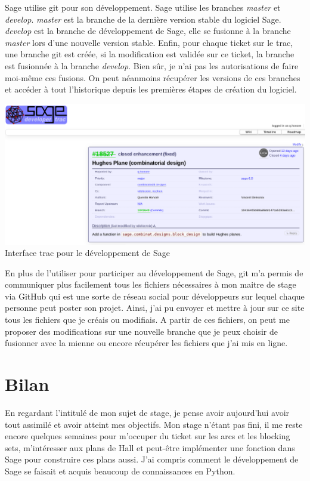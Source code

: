 \documentclass[a4paper]{article}
\begin{document}
Sage utilise git pour son développement. Sage utilise les branches \textit{master} et \textit{develop}. \textit{master} est la branche de la dernière version stable du logiciel Sage. \textit{develop} est la branche de développement de Sage, elle se fusionne à la branche \textit{master} lors d'une nouvelle version stable. Enfin, pour chaque ticket sur le trac, une branche git est créée, si la modification est validée sur ce ticket, la branche est fusionnée à la branche \textit{develop}. Bien sûr, je n'ai pas les autorisations de faire moi-même ces fusions. On peut néanmoins récupérer les versions de ces branches et accéder à tout l'historique depuis les premières étapes de création du logiciel. \vspace{2\baselineskip}\\
\begin{center}
  \includegraphics[scale=0.5]{trac.png}\\
  Interface trac pour le développement de Sage
\end{center}
\vspace{1\baselineskip}
En plus de l'utiliser pour participer au développement de Sage, git m'a permis de communiquer plus facilement tous les fichiers nécessaires à mon maitre de stage via GitHub qui est une sorte de réseau social pour développeurs sur lequel chaque personne peut poster son projet. Ainsi, j'ai pu envoyer et mettre à jour sur ce site tous les fichiers que je créais ou modifiais. A partir de ces fichiers, on peut me proposer des modifications sur une nouvelle branche que je peux choisir de fusionner avec la mienne ou encore récupérer les fichiers que j'ai mis en ligne.


\newpage
\section*{Bilan}
En regardant l'intitulé de mon sujet de stage, je pense avoir aujourd'hui avoir tout assimilé et avoir atteint mes objectifs. Mon stage n'étant pas fini, il me reste encore quelques semaines pour m'occuper du ticket sur les arcs et les blocking sets, m'intéresser aux plans de Hall et peut-être implémenter une fonction dans Sage pour construire ces plans aussi. J'ai compris comment le développement de Sage se faisait et acquis beaucoup de connaissances en Python.\\
\end{document}
